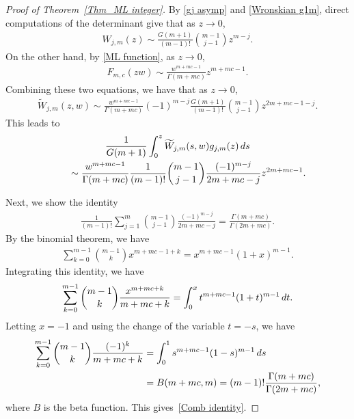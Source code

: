 \documentclass[11pt]{article}
\numberwithin{equation}{section}
\numberwithin{equation}{section}
\newcommand{\1}{\chi}
\begin{document}
\begin{proof}[Proof of Theorem~\ref{Thm_ML integer}]
	By \eqref{gj asymp} and \eqref{Wronskian g1m}, direct computations of the determinant give that as $z \to 0$,
	\begin{gather*}
	W_{j,m}(z) \sim \frac{G(m+1)}{(m-1)!} \binom{m-1}{j-1} z^{m-j}.
	\end{gather*}
	On the other hand, by \eqref{ML function}, as $z \to 0$,
	\begin{gather*}
	F_{m,c}(zw) \sim \frac{w^{m+mc-1}}{\Gamma(m+mc)} z^{m+mc-1}.
	\end{gather*}
	Combining these two equations, we have that as $z\to 0$,
	\begin{gather*}
	\widetilde{W}_{j,m}(z,w) \sim \frac{w^{m+mc-1}}{\Gamma(m+mc)} (-1)^{m-j} \frac{G(m+1)}{(m-1)!} \binom{m-1}{j-1} z^{2m+mc-1-j}.
	\end{gather*}
	This leads to
	\begin{gather*}
	\frac{1}{G(m+1)}\int_0^z \widetilde{W}_{j,m}(s,w) g_{j,m}(z)\,{\rm d}s\\
\qquad{} \sim \frac{w^{m+mc-1}}{\Gamma(m+mc)} \frac{1}{(m-1)!} \binom{m-1}{j-1} \frac{(-1)^{m-j} }{2m+mc-j} z^{2m+mc-1}.
	\end{gather*}
	
	Next, we show the identity
	\begin{gather}\label{Comb identity}
		\frac{1}{(m-1)!} \sum_{j=1}^{m} \binom{m-1}{j-1} \frac{(-1)^{m-j} }{2m+mc-j} = \frac{\Gamma(m+mc)}{\Gamma(2m+mc)}.
	\end{gather}
	By the binomial theorem, we have
	\begin{gather*}
	\sum_{k=0}^{m-1} \binom{m-1}{k} x^{m+mc-1+k} = x^{m+mc-1}(1+x)^{m-1}.
	\end{gather*}
	Integrating this identity, we have
	\begin{gather*}
	\sum_{k=0}^{m-1} \binom{m-1}{k} \frac{x^{m+mc+k}}{m+mc+k} = \int_0^x t^{m+mc-1}(1+t)^{m-1}\,{\rm d}t.
	\end{gather*}
	Letting $x=-1$ and using the change of the variable $t=-s$, we have
	\begin{align*}
		\sum_{k=0}^{m-1} \binom{m-1}{k} \frac{(-1)^{k}}{m+mc+k} &= \int_0^1 s^{m+mc-1}(1-s)^{m-1}\,{\rm d}s
		\\
		&=B(m+mc,m)=(m-1)! \frac{\Gamma(m+mc)}{\Gamma(2m+mc)},
	\end{align*}
	where $B$ is the beta function. This gives~\eqref{Comb identity}.
	

\end{proof}
\end{document}
